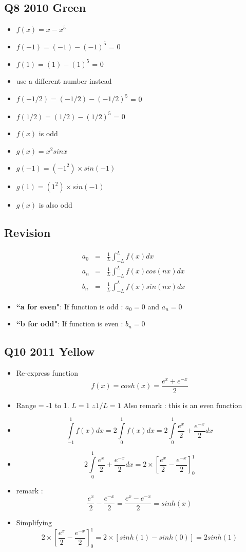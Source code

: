 \documentclass[11pt,a4paper,titlepage,oneside,openany]{article}
\numberwithin{equation}{section}
\numberwithin{algorithm}{section}
\numberwithin{figure}{section}
\numberwithin{table}{section}
\begin{document}
\subsection{Q8 2010 Green}
\begin{itemize}
\item $f(x) = x - x^5$
\item $f(-1) = (-1) - (-1)^5$ = 0
\item $f(1) = (1) - (1)^5$ = 0
\item use a different number instead
\item $f(-1/2) = (-1/2) - (-1/2)^5$ = 0
\item $f(1/2) = (1/2) - (1/2)^5$ = 0
\item $f(x)$ is odd

\item $g(x) = x^2 sin x$
\item $g(-1) = (-1^2) \times sin(-1)$
\item $g(1) = (1^2) \times sin(-1)$
\item $g(x)$ is also odd
\end{itemize}
\newpage
\subsection*{Revision}
\Large{

\begin{eqnarray}
a_0 &=& \frac{1}{L}\int^{L }_{-L} f(x) dx \\
a_n &=& \frac{1}{L}\int^{L }_{-L} f(x) cos(nx) dx \\ 
b_n &=& \frac{1}{L}\int^{L }_{-L} f(x) sin(nx) dx
\end{eqnarray}

\begin{itemize}
\item \textbf{ ``a for even"}: If function is odd : $a_0 = 0$ and $a_n=0$
\item \textbf{ ``b for odd"}: If function is even : $b_n=0$
\end{itemize}
}
\subsection*{Q10 2011 Yellow} %
\Large{
\begin{itemize}
\item Re-express function \[f(x) = cosh(x) = \frac{e^{x} + e^{-x}}{2} \]
\item Range = -1 to 1. $L=1$ $\therefore 1/L = 1$ Also remark : this is an even function
\item \[\int\limits^{1}_{-1} f(x) dx = 2\int\limits^{1}_{0} f(x) dx = 2\int\limits^{1}_{0}\frac{e^{x}}{2} + \frac{e^{-x}}{2} dx \]
    \item \[ 2\int\limits^{1}_{0}\frac{e^{x}}{2} + \frac{e^{-x}}{2} dx  = 2\times \left[ \frac{e^{x}}{2} - \frac{e^{-x}}{2} \right]^{1}_{0} \]
\item remark : \[ \frac{e^{x}}{2} - \frac{e^{-x}}{2} = \frac{e^{x} - e^{-x}}{2}= sinh(x )\] 
\item Simplifying 
\[ 2\times \left[ \frac{e^{x}}{2} - \frac{e^{-x}}{2} \right]^{1}_{0}  = 2\times \left[sinh(1) - sinh(0)\right] = 2sinh(1) \]
\end{itemize}
}
\newpage
\end{document}
